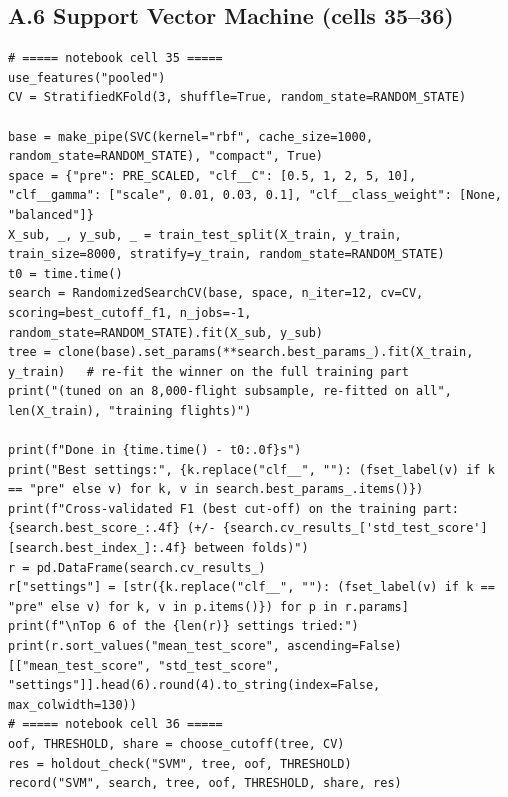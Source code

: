 \documentclass[12pt,a4paper]{article}
\begin{document}
\subsection*{A.6 Support Vector Machine (cells 35--36)}
\begin{lstlisting}[style=code]
# ===== notebook cell 35 =====
use_features("pooled")
CV = StratifiedKFold(3, shuffle=True, random_state=RANDOM_STATE)

base = make_pipe(SVC(kernel="rbf", cache_size=1000, random_state=RANDOM_STATE), "compact", True)
space = {"pre": PRE_SCALED, "clf__C": [0.5, 1, 2, 5, 10], "clf__gamma": ["scale", 0.01, 0.03, 0.1], "clf__class_weight": [None, "balanced"]}
X_sub, _, y_sub, _ = train_test_split(X_train, y_train, train_size=8000, stratify=y_train, random_state=RANDOM_STATE)
t0 = time.time()
search = RandomizedSearchCV(base, space, n_iter=12, cv=CV, scoring=best_cutoff_f1, n_jobs=-1, random_state=RANDOM_STATE).fit(X_sub, y_sub)
tree = clone(base).set_params(**search.best_params_).fit(X_train, y_train)   # re-fit the winner on the full training part
print("(tuned on an 8,000-flight subsample, re-fitted on all", len(X_train), "training flights)")

print(f"Done in {time.time() - t0:.0f}s")
print("Best settings:", {k.replace("clf__", ""): (fset_label(v) if k == "pre" else v) for k, v in search.best_params_.items()})
print(f"Cross-validated F1 (best cut-off) on the training part: {search.best_score_:.4f} (+/- {search.cv_results_['std_test_score'][search.best_index_]:.4f} between folds)")
r = pd.DataFrame(search.cv_results_)
r["settings"] = [str({k.replace("clf__", ""): (fset_label(v) if k == "pre" else v) for k, v in p.items()}) for p in r.params]
print(f"\nTop 6 of the {len(r)} settings tried:")
print(r.sort_values("mean_test_score", ascending=False)[["mean_test_score", "std_test_score", "settings"]].head(6).round(4).to_string(index=False, max_colwidth=130))
# ===== notebook cell 36 =====
oof, THRESHOLD, share = choose_cutoff(tree, CV)
res = holdout_check("SVM", tree, oof, THRESHOLD)
record("SVM", search, tree, oof, THRESHOLD, share, res)
\end{lstlisting}
\end{document}
